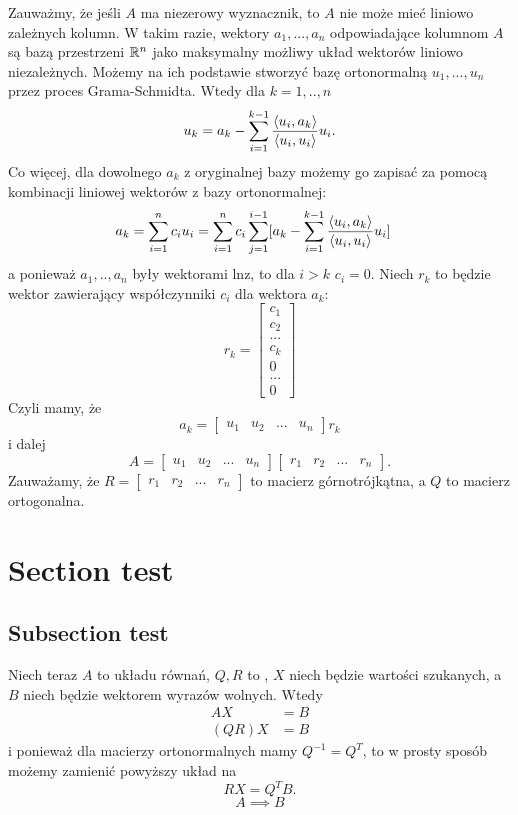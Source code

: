 \documentclass{article}
\begin{document}
Zauważmy, że jeśli $A$ ma niezerowy wyznacznik, to $A$ nie może mieć liniowo zależnych kolumn. W takim razie, wektory $a_1,...,a_n$ odpowiadające kolumnom $A$ są bazą przestrzeni $\mathbb{R}^n$ jako maksymalny możliwy układ wektorów liniowo niezależnych. Możemy na ich podstawie stworzyć bazę ortonormalną $u_1,...,u_n$ przez proces Grama-Schmidta. Wtedy dla $k=1,..,n$
$$u_k=a_k-\sum\limits_{i=1}^{k-1}{\langle u_i,a_k\rangle\over \langle u_i,u_i\rangle}u_i.$$
Co więcej, dla dowolnego $a_k$ z oryginalnej bazy możemy go zapisać za pomocą kombinacji liniowej wektorów z bazy ortonormalnej:
\begin{align*}
    a_k&=\sum\limits_{i=1}^n c_iu_i=\sum\limits_{i=1}^nc_i\sum\limits_{j=1}^{i-1} [a_k-\sum\limits_{i=1}^{k-1}{\langle u_i,a_k\rangle\over \langle u_i,u_i\rangle}u_i]
\end{align*}
a ponieważ $a_1,..,a_n$ były wektorami lnz, to dla $i> k$ $c_i=0$. Niech $r_k$ to będzie wektor zawierający współczynniki $c_i$ dla wektora $a_k$:
$$r_k=\begin{bmatrix}
    c_1\\
    c_2\\
    ...\\
    c_k\\
    0\\
    ...\\
    0
\end{bmatrix}$$
Czyli mamy, że
$$a_k=\begin{bmatrix}
    u_1&u_2&...&u_n
\end{bmatrix}r_k
$$
i dalej
$$
A=\begin{bmatrix}
    u_1&u_2&...&u_n
\end{bmatrix}\begin{bmatrix}
    r_1&r_2&...&r_n
\end{bmatrix}.
$$
Zauważamy, że $R=\begin{bmatrix}
    r_1&r_2&...&r_n
\end{bmatrix}$ to macierz górnotrójkątna, a $Q$ to macierz ortogonalna.

\section{Section test}

\subsection{Subsection test}

Niech teraz $A$ to  układu równań, $Q,R$ to , $X$ niech będzie  wartości szukanych, a $B$ niech będzie wektorem wyrazów wolnych. Wtedy
\begin{align*}
    AX&=B\\
    (QR)X&=B
\end{align*}
i ponieważ dla macierzy ortonormalnych mamy $Q^{-1}=Q^T$, to w prosty sposób możemy zamienić powyższy układ na
$$RX=Q^TB.$$
$$A\implies B$$
\proofend
\end{document}
